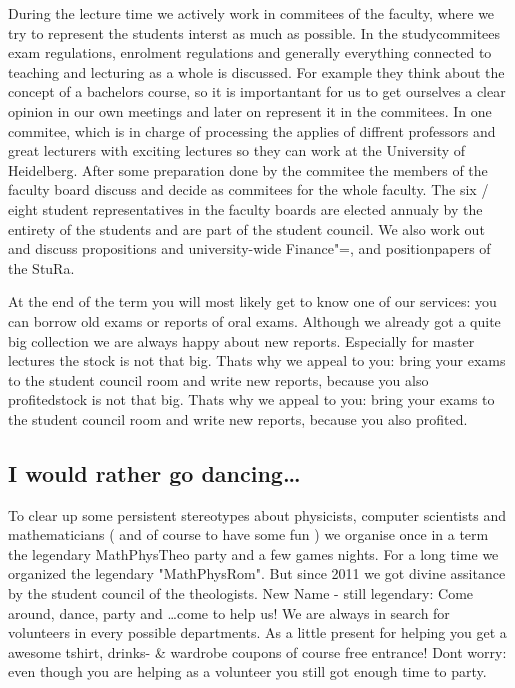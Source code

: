 During the lecture time we actively work in commitees of the faculty, where we try to represent the students interst as much as possible. In the studycommitees exam regulations, enrolment regulations and generally everything connected to teaching and lecturing as a whole is discussed. For example they think about the concept of a bachelors course, so it is importantant for us to get ourselves a clear opinion in our own meetings and later on represent it in the commitees. In one commitee, which is in charge of processing the applies of diffrent professors and great lecturers with exciting lectures so they can work at the University of Heidelberg. After some preparation done by the commitee the members of the faculty board discuss and decide as commitees for the whole faculty. The six / eight student representatives in the faculty boards are elected annualy by the entirety of the students and are part of the student council. We also work out and discuss propositions and university-wide Finance"=, and positionpapers of the \gls{StuRa}.

At the end of the term you will most likely get to know one of our services: you can borrow old exams or reports of oral exams. Although we already got a quite big collection we are always happy about new reports. Especially for master lectures the stock is not that big. Thats why we appeal to you: bring your exams to the student council room and write new reports, because you also profitedstock is not that big. Thats why we appeal to you: bring your exams to the student council room and write new reports, because you also profited.

\subsection{I would rather go dancing\dots}
To clear up some persistent stereotypes about physicists, computer scientists and mathematicians ( and of course to have some fun ) we organise once in a term the legendary MathPhysTheo party and a few games nights. For a long time we organized the legendary "MathPhysRom". But since 2011 we got divine assitance by the student council of the theologists. New Name - still legendary: Come around, dance, party and \dots come to help us! We are always in search for volunteers in every possible departments. As a little present for helping you get a awesome tshirt, drinks- & wardrobe coupons of course free entrance! Dont worry: even though you are helping as a volunteer you still got enough time to party. 


